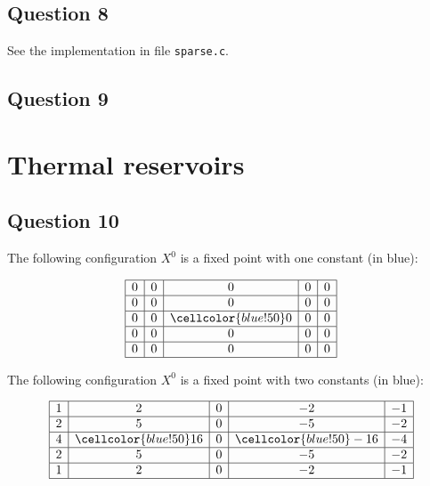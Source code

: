 
\subsection*{Question 8}

See the implementation in file \texttt{sparse.c}.


\subsection*{Question 9}


\section{Thermal reservoirs}


\subsection*{Question 10}
 
\begin{ex}
  The following configuration $X^0$ is a fixed point with one constant (in blue):
  
  \[\begin{array}{ | c | c | c | c | c |} \hline
    0 & 0 & 0 & 0 & 0\\ \hline
    0 & 0 & 0 & 0 & 0\\ \hline
    0 & 0 & \cellcolor{blue!50} 0 & 0 & 0\\ \hline
    0 & 0 & 0 & 0 & 0\\ \hline
    0 & 0 & 0 & 0 & 0\\ \hline
  \end{array}\]
\end{ex}

\begin{ex}
  The following configuration $X^0$ is a fixed point with two constants (in blue):
  
  \[\begin{array}{ | c | c | c | c | c |} \hline
    1 & 2 & 0 & -2 & -1\\ \hline
    2 & 5 & 0 & -5 & -2\\ \hline
    4 & \cellcolor{blue!50} 16 & 0 & \cellcolor{blue!50}  -16 & -4\\ \hline
    2 & 5 & 0 & -5 & -2\\ \hline
    1 & 2 & 0 & -2 & -1\\ \hline
  \end{array}\]
\end{ex}

